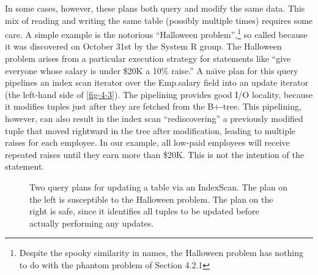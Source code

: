 \documentclass[b5paper,11pt,twoside,openright]{book}
\begin{document}
In some cases, however, these plans both query and modify the same data.
This mix of reading and writing the same table (possibly multiple times)
requires some care. A simple example is the notorious ``Halloween
problem'',\footnote{Despite the spooky similarity in names, the Halloween problem has
nothing to do with the phantom problem of Section 4.2.1} so called because it was discovered on
October 31st by the System R group. The Halloween problem arises from a
particular execution strategy for statements like ``give everyone whose
salary is under \$20K a 10\% raise.'' A na{\"\i}ve plan for this query
pipelines an index scan iterator over the Emp.salary field into an
update iterator (the left-hand side of \autoref{fig-4-3}). The pipelining
provides good I/O
locality, because it modifies tuples just after they are fetched from
the B+-tree. This pipelining, however, can also result in the index scan
``rediscovering'' a previously modified tuple that moved rightward in
the tree after modification, leading to multiple raises for each
employee. In our example, all low-paid employees will receive repeated
raises until they earn more than \$20K. This is not the intention of the
statement.

\begin{figure}
\centering
\centering
{}

\caption{Two query plans for updating a table via an IndexScan. The plan
on the left is susceptible to the Halloween problem. The plan on the
right is safe, since it identifies all tuples to be updated before
actually performing any updates.\label{fig-4-3}}
\end{figure}
\end{document}
